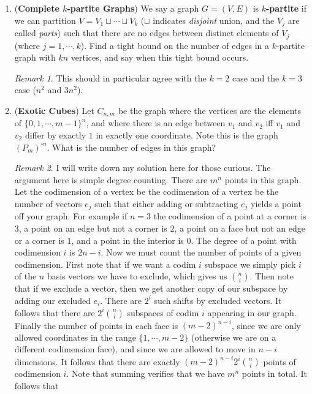 \documentclass{article}
\newcommand{\question}[1]{\item (\textbf{#1})}
\theoremstyle{remark}
\newtheorem*{remark}{Remark}
\begin{document}
\begin{enumerate}
    \question{Complete $k$-partite Graphs} We say a graph $G=(V,E)$ is \textbf{$k$-partite} if we can partition $V = V_1 \sqcup \cdots \sqcup V_k$ ($\sqcup$ indicates \textit{disjoint} union, and the $V_j$ are called \textit{parts}) such that there are no edges between distinct elements of $V_j$ (where $j = 1, \cdots, k$). Find a tight bound on the number of edges in a $k$-partite graph with $kn$ vertices, and say when this tight bound occurs.

    \begin{remark}
        This should in particular agree with the $k=2$ case and the $k=3$ case ($n^2$ and $3 n^2$).
    \end{remark}

    \question{Exotic Cubes} Let $C_{n,m}$ be the graph where the vertices are the elements of $\{ 0, 1 , \cdots, m-1\}^n$, and where there is an edge between $v_1$ and $v_2$ iff $v_1 $ and $v_2$ differ by exactly $1$ in exactly one coordinate. Note this is the graph $(P_m)^{\square n}$. What is the number of edges in this graph?
    \begin{remark}
        I will write down my solution here for those curious. The argument here is simple degree counting. There are $m^n$ points in this graph. Let the codimension of a vertex be the codimension of a vertex be the number of vectors $e_j$ such that either adding or subtracting $e_j$ yields a point off your graph. For example if $n=3$ the codimension of a point at a corner is $3$, a point on an edge but not a corner is $2$, a point on a face but not an edge or a corner is $1$, and a point in the interior is $0$. The degree of a point with codimension $i$ is $2n-i$. Now we must count the number of points of a given codimension. First note that if we want a codim $i$ subspace we simply pick $i$ of the $n$ basis vectors we have to exclude, which gives us $\binom{n}{i}$. Then note that if we exclude a vector, then we get another copy of our subspace by adding our excluded $e_i$. There are $2^i$ such shifts by excluded vectors. It follows that there are $2^i \binom{n}{i}$ subspaces of codim $i$ appearing in our graph. Finally the number of points in each face is $(m-2)^{n-i}$, since we are only allowed coordinates in the range $\{ 1 , \cdots, m-2 \}$ (otherwise we are on a different codimension face), and since we are allowed to move in $n-i$ dimensions. It follows that there are exactly $(m-2)^{n-i} 2^i \binom{n}{i}$ points of codimension $i$. Note that summing verifies that we have $m^n$ points in total. It follows that
        \begin{align*}

\end{align*}
\end{remark}
\end{enumerate}
\end{document}
